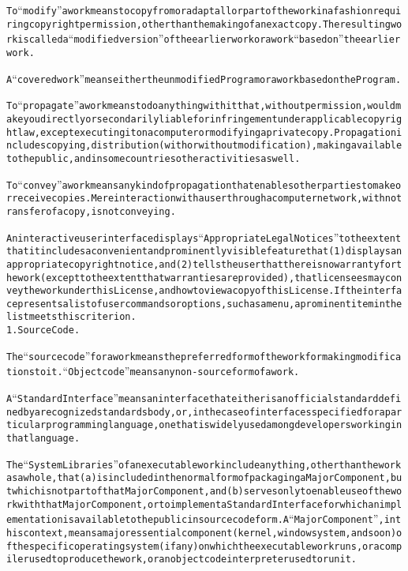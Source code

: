\begin{alltt}
To “modify” a work means to copy from or adapt all or part of the work in a fashion requiring copyright permission, other than the making of an exact copy. The resulting work is called a “modified version” of the earlier work or a work “based on” the earlier work.

A “covered work” means either the unmodified Program or a work based on the Program.

To “propagate” a work means to do anything with it that, without permission, would make you directly or secondarily liable for infringement under applicable copyright law, except executing it on a computer or modifying a private copy. Propagation includes copying, distribution (with or without modification), making available to the public, and in some countries other activities as well.

To “convey” a work means any kind of propagation that enables other parties to make or receive copies. Mere interaction with a user through a computer network, with no transfer of a copy, is not conveying.

An interactive user interface displays “Appropriate Legal Notices” to the extent that it includes a convenient and prominently visible feature that (1) displays an appropriate copyright notice, and (2) tells the user that there is no warranty for the work (except to the extent that warranties are provided), that licensees may convey the work under this License, and how to view a copy of this License. If the interface presents a list of user commands or options, such as a menu, a prominent item in the list meets this criterion.
1. Source Code.

The “source code” for a work means the preferred form of the work for making modifications to it. “Object code” means any non-source form of a work.

A “Standard Interface” means an interface that either is an official standard defined by a recognized standards body, or, in the case of interfaces specified for a particular programming language, one that is widely used among developers working in that language.

The “System Libraries” of an executable work include anything, other than the work as a whole, that (a) is included in the normal form of packaging a Major Component, but which is not part of that Major Component, and (b) serves only to enable use of the work with that Major Component, or to implement a Standard Interface for which an implementation is available to the public in source code form. A “Major Component”, in this context, means a major essential component (kernel, window system, and so on) of the specific operating system (if any) on which the executable work runs, or a compiler used to produce the work, or an object code interpreter used to run it.


\end{alltt}
